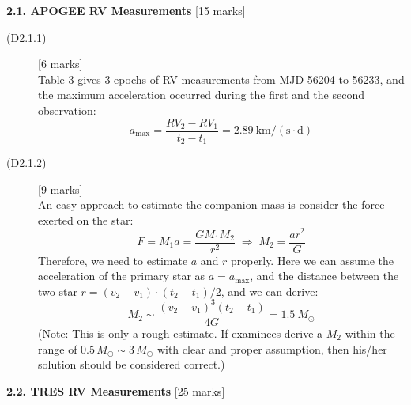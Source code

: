 
\noindent\textbf{2.1. APOGEE RV Measurements} \hfill[15 marks]

\begin{description}
\item[(D2.1.1)] \hfill[6 marks]\\
  Table 3 gives 3 epochs of RV measurements from MJD 56204 to 56233, and the
  maximum acceleration occurred during the first and the second observation:
  \[ a_{\max} = \frac{RV_2 - RV_1}{t_2 - t_1}
     = 2.89\ \mathrm{km/(s \cdot d)} \tag*{(15)} \]

\item[(D2.1.2)] \hfill[9 marks]\\
  An easy approach to estimate the companion mass is consider the force
  exerted on the star:
  \[ F = M_1 a = \frac{G M_1 M_2}{r^2}
     \;\Rightarrow\; M_2 = \frac{a r^2}{G} \tag*{(16)} \]
  Therefore, we need to estimate $a$ and $r$ properly. Here we can assume the
  acceleration of the primary star as $a = a_{\max}$, and the distance
  between the two star $r = (v_2 - v_1) \cdot (t_2 - t_1)/2$, and we can
  derive:
  \[ M_2 \sim \frac{(v_2 - v_1)^3 (t_2 - t_1)}{4G}
     = 1.5\ M_\odot \tag*{(17)} \]
  (Note: This is only a rough estimate. If examinees derive a $M_2$ within
  the range of $0.5\,M_\odot \sim 3\,M_\odot$ with clear and proper
  assumption, then his/her solution should be considered correct.)
\end{description}

\medskip
\noindent\textbf{2.2. TRES RV Measurements} \hfill[25 marks]

